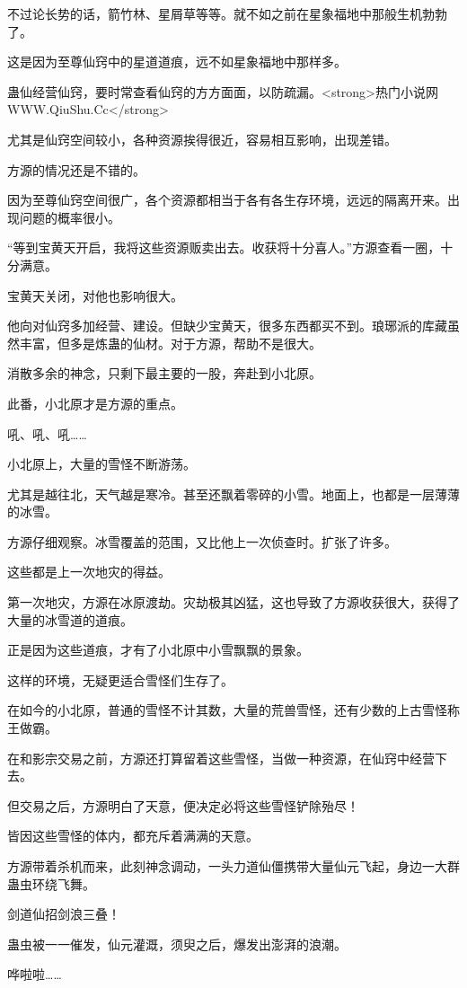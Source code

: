 \begin{this_body}
不过论长势的话，箭竹林、星屑草等等。就不如之前在星象福地中那般生机勃勃了。

这是因为至尊仙窍中的星道道痕，远不如星象福地中那样多。

蛊仙经营仙窍，要时常查看仙窍的方方面面，以防疏漏。<strong>热门小说网WWW.QiuShu.Cc</strong>

尤其是仙窍空间较小，各种资源挨得很近，容易相互影响，出现差错。

方源的情况还是不错的。

因为至尊仙窍空间很广，各个资源都相当于各有各生存环境，远远的隔离开来。出现问题的概率很小。

“等到宝黄天开启，我将这些资源贩卖出去。收获将十分喜人。”方源查看一圈，十分满意。

宝黄天关闭，对他也影响很大。

他向对仙窍多加经营、建设。但缺少宝黄天，很多东西都买不到。琅琊派的库藏虽然丰富，但多是炼蛊的仙材。对于方源，帮助不是很大。

消散多余的神念，只剩下最主要的一股，奔赴到小北原。

此番，小北原才是方源的重点。

吼、吼、吼……

小北原上，大量的雪怪不断游荡。

尤其是越往北，天气越是寒冷。甚至还飘着零碎的小雪。地面上，也都是一层薄薄的冰雪。

方源仔细观察。冰雪覆盖的范围，又比他上一次侦查时。扩张了许多。

这些都是上一次地灾的得益。

第一次地灾，方源在冰原渡劫。灾劫极其凶猛，这也导致了方源收获很大，获得了大量的冰雪道的道痕。

正是因为这些道痕，才有了小北原中小雪飘飘的景象。

这样的环境，无疑更适合雪怪们生存了。

在如今的小北原，普通的雪怪不计其数，大量的荒兽雪怪，还有少数的上古雪怪称王做霸。

在和影宗交易之前，方源还打算留着这些雪怪，当做一种资源，在仙窍中经营下去。

但交易之后，方源明白了天意，便决定必将这些雪怪铲除殆尽！

皆因这些雪怪的体内，都充斥着满满的天意。

方源带着杀机而来，此刻神念调动，一头力道仙僵携带大量仙元飞起，身边一大群蛊虫环绕飞舞。

剑道仙招剑浪三叠！

蛊虫被一一催发，仙元灌溉，须臾之后，爆发出澎湃的浪潮。

哗啦啦……


\end{this_body}
